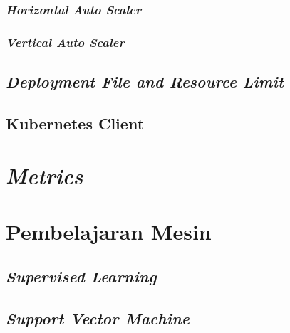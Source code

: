 \subsubsection{\textit{Horizontal Auto Scaler}}

\subsubsection{\textit{Vertical Auto Scaler}}

\subsection{\textit{Deployment File and Resource Limit}}

\subsection{Kubernetes Client}

\section{\textit{Metrics}}

\section{Pembelajaran Mesin}

\subsection{\textit{Supervised Learning}}

\subsection{\textit{Support Vector Machine}}